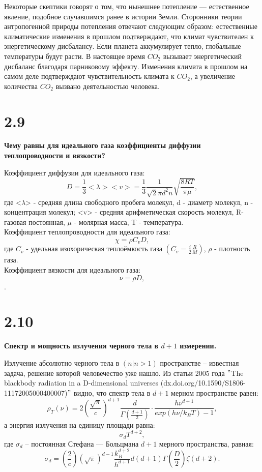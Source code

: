 \documentclass[a4paper,14pt]{article}
\begin{document}
Некоторые скептики говорят о том, что нынешнее потепление --- естественное явление, подобное случавшимся ранее в истории Земли. Сторонники теории антропогенной природы потепления отвечают следующим образом: естественные климатические изменения в прошлом подтверждают, что климат чувствителен к энергетическому дисбалансу. Если планета аккумулирует тепло, глобальные температуры будут расти. В настоящее время $CO_{2}$ вызывает энергетический дисбаланс благодаря парниковому эффекту. Изменения климата в прошлом на самом деле подтверждают чувствительность климата к $CO_{2}$, а увеличение количества $CO_{2}$ вызвано деятельностью человека.
\newline

\section*{2.9}
\begin{center}
	\LARGE{\textbf{Чему равны для идеального газа коэффициенты диффузии теплопроводности и вязкости?}}
\end{center}	
Коэффициент диффузии для идеального газа: \[ D=\frac{1}{3}<\lambda><v>=\frac{1}{3}\frac{1}{\sqrt{2} \pi d^2 n} \sqrt{\frac{8 R T}{\pi \mu}},\] где <$\lambda$> - средняя длина свободного пробега молекул, d - диаметр молекул, n - концентрация молекул; <v> - средняя арифметическая скорость молекул, R-газовая постоянная, $\mu$ - молярная масса, T - температура.
\\Коэффициент теплопроводности для идеального газа: \[ \chi=\rho C_{v} D,\] где $C_{v}$ - удельная изохорическая теплоёмкость газа $(C_{v}=\frac{i}{2}\frac{R}{M})$, $\rho$ - плотность газа.
\\Коэффициент вязкости для идеального газа: \[\nu=\rho D,\].

\section*{2.10}
\begin{center}
	\LARGE{\textbf{Спектр и мощность излучения черного тела в $d + 1$ измерении.}}
\end{center}
Излучение абсолютно черного тела в $(n|n > 1)$ пространстве -- известная задача, решение которой человечество уже нашло. Из статьи 2005 года $"$The blackbody radiation in a D-dimensional universes (dx.doi.org/10.1590/S1806-11172005000400007)$"$ видно, что спектр тела в $d+1$ мерном пространстве равен:
\begin{equation*}
	\rho_T(\nu) = 2 \left( \frac{\sqrt{\pi}}{c} \right) ^{d + 1} \frac{d}{\Gamma \left( \frac{d + 1}{2} \right)}\cdot\frac{h\nu^{d + 1}}{exp(h\nu / k_B T) - 1},
\end{equation*}
а энергия излучения на единицу площади равна:
\begin{equation*}
	\sigma_d T^{d + 2},
\end{equation*}
где $\sigma_d$ -- постоянная Стефана — Больцмана $d + 1$ мерного пространства, равная:
\begin{equation*}
	\sigma_d = \left( \frac{2}{c} \right) (\sqrt{\pi})^{d - 1} \frac{k_B^{d+2}}{h^{d + 1}} d (d + 1) \Gamma \left( \frac{D}{2} \right) \zeta(d + 2).
\end{equation*}
\end{document}
